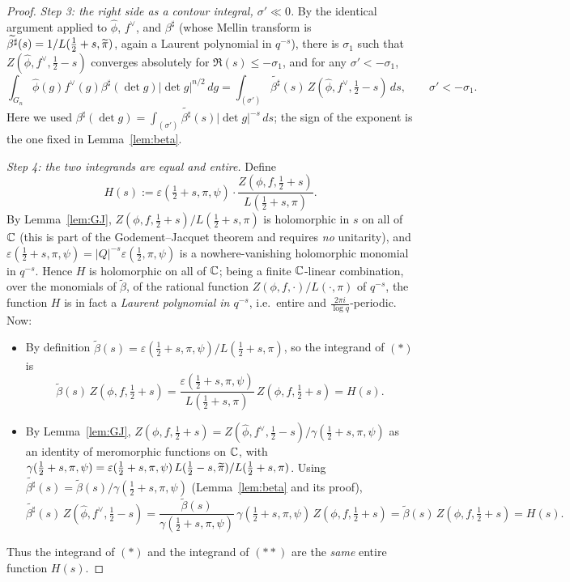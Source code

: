 \begin{proof}
\smallskip
\emph{Step 3: the right side as a contour integral, $\sigma'\ll0$.} By the identical argument
applied to $\widehat\phi$, $f^\vee$, and $\beta^\sharp$ (whose Mellin transform is
$\widetilde{\beta^\sharp}(s)=1/L(\tfrac12+s,\widetilde{\pi})$, again a Laurent polynomial in
$q^{-s}$), there is $\sigma_1$ such that $Z(\widehat\phi,f^\vee,\tfrac12-s)$ converges
absolutely for $\Re(s)\le-\sigma_1$, and for any $\sigma'<-\sigma_1$,
\[
\int_{G_n}\widehat\phi(g)f^\vee(g)\beta^\sharp(\det g)|\det g|^{n/2}\,dg
=\int_{(\sigma')}\widetilde{\beta^\sharp}(s)\,Z(\widehat\phi,f^\vee,\tfrac12-s)\,ds ,\qquad
\sigma'<-\sigma_1 .
\tag{$\ast\ast$}
\]
Here we used $\beta^\sharp(\det g)=\int_{(\sigma')}\widetilde{\beta^\sharp}(s)|\det g|^{-s}\,ds$;
the sign of the exponent is the one fixed in Lemma~\ref{lem:beta}.

\smallskip
\emph{Step 4: the two integrands are equal and entire.} Define
\[
H(s):=\varepsilon(\tfrac12+s,\pi,\psi)\cdot\frac{Z(\phi,f,\tfrac12+s)}{L(\tfrac12+s,\pi)} .
\]
By Lemma~\ref{lem:GJ}, $Z(\phi,f,\tfrac12+s)/L(\tfrac12+s,\pi)$ is holomorphic in $s$ on all of
$\mathbb{C}$ (this is part of the Godement--Jacquet theorem and requires \emph{no} unitarity), and
$\varepsilon(\tfrac12+s,\pi,\psi)=|Q|^{-s}\varepsilon(\tfrac12,\pi,\psi)$ is a nowhere-vanishing
holomorphic monomial in $q^{-s}$. Hence $H$ is holomorphic on all of $\mathbb{C}$; being a finite
$\mathbb{C}$-linear combination, over the monomials of $\tilde\beta$, of the rational function
$Z(\phi,f,\cdot)/L(\cdot,\pi)$ of $q^{-s}$, the function $H$ is in fact a \emph{Laurent
polynomial in $q^{-s}$}, i.e.\ entire and $\frac{2\pi i}{\log q}$-periodic. Now:
\begin{itemize}\setlength\itemsep{2pt}
\item By definition $\tilde\beta(s)=\varepsilon(\tfrac12+s,\pi,\psi)/L(\tfrac12+s,\pi)$, so the
integrand of $(\ast)$ is
\[
\tilde\beta(s)\,Z(\phi,f,\tfrac12+s)
=\frac{\varepsilon(\tfrac12+s,\pi,\psi)}{L(\tfrac12+s,\pi)}\,Z(\phi,f,\tfrac12+s)=H(s).
\]
\item By Lemma~\ref{lem:GJ}, $Z(\phi,f,\tfrac12+s)=Z(\widehat\phi,f^\vee,\tfrac12-s)/\gamma(\tfrac12+s,\pi,\psi)$
as an identity of meromorphic functions on $\mathbb{C}$, with
$\gamma(\tfrac12+s,\pi,\psi)=\varepsilon(\tfrac12+s,\pi,\psi)\,L(\tfrac12-s,\widetilde{\pi})/L(\tfrac12+s,\pi)$.
Using $\widetilde{\beta^\sharp}(s)=\tilde\beta(s)/\gamma(\tfrac12+s,\pi,\psi)$
(Lemma~\ref{lem:beta} and its proof),
\[
\widetilde{\beta^\sharp}(s)\,Z(\widehat\phi,f^\vee,\tfrac12-s)
=\frac{\tilde\beta(s)}{\gamma(\tfrac12+s,\pi,\psi)}\,
\gamma(\tfrac12+s,\pi,\psi)\,Z(\phi,f,\tfrac12+s)
=\tilde\beta(s)\,Z(\phi,f,\tfrac12+s)=H(s).
\]
\end{itemize}
Thus the integrand of $(\ast)$ and the integrand of $(\ast\ast)$ are the \emph{same} entire
function $H(s)$.


\end{proof}

